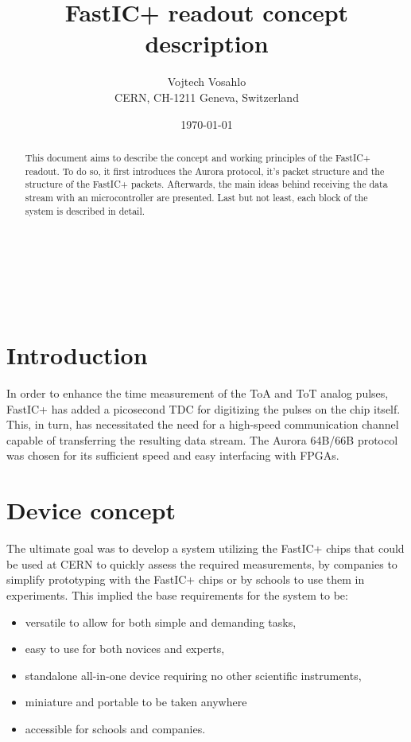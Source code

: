 \documentclass{cernatsnote}
\title{FastIC+ readout concept description}
\author{
	Vojtech Vosahlo \; \\		
	CERN, CH-1211 Geneva, Switzerland
}
\date{\today}
\begin{document}
\maketitle

\begin{abstract}
This document aims to describe the concept and working principles of the FastIC+ readout. To do so, it first introduces the Aurora protocol, it's packet structure and the structure of the FastIC+ packets. Afterwards, the main ideas behind receiving the data stream with an microcontroller are presented. Last but not least, each block of the system is described in detail.
\end{abstract}
\\ \\ \\ 

\begingroup
\color{black}
\tableofcontents
\endgroup

\pagebreak

\section{Introduction}
In order to enhance the time measurement of the ToA and ToT analog pulses, FastIC+ has added a picosecond TDC for digitizing the pulses on the chip itself. This, in turn, has necessitated the need for a high-speed communication channel capable of transferring the resulting data stream. The Aurora 64B/66B protocol was chosen for its sufficient speed and easy interfacing with FPGAs.

%
%
%

\section{Device concept}
The ultimate goal was to develop a system utilizing the FastIC+ chips that could be used at CERN to quickly assess the required measurements, by companies to simplify prototyping with the FastIC+ chips or by schools to use them in experiments. This implied the base requirements for the system to be:
\begin{itemize}
    \item versatile to allow for both simple and demanding tasks,
    \item easy to use for both novices and experts,
    \item standalone all-in-one device requiring no other scientific instruments,
    \item miniature and portable to be taken anywhere
    \item accessible for schools and companies.
\end{itemize}
\end{document}

